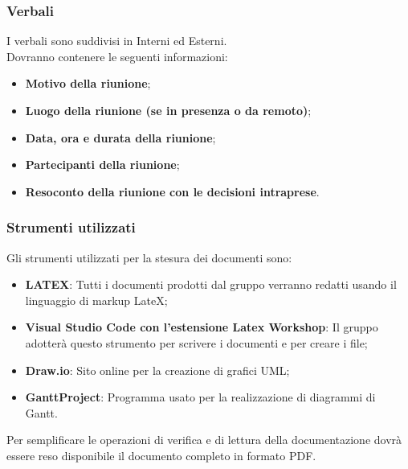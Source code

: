 \subsubsection{Verbali}\label{Verbali}
I verbali sono suddivisi in Interni ed Esterni.\\
Dovranno contenere le seguenti informazioni:
\begin{itemize}
    \item \textbf{Motivo della riunione};
    \item \textbf{Luogo della riunione (se in presenza o da remoto)};
    \item \textbf{Data, ora e durata della riunione};
    \item \textbf{Partecipanti della riunione};
    \item \textbf{Resoconto della riunione con le decisioni intraprese}.
\end{itemize}

\subsubsection{Strumenti utilizzati}
Gli strumenti utilizzati per la stesura dei documenti sono:
\begin{itemize}
    \item \textbf{LATEX}: Tutti i documenti prodotti dal gruppo verranno redatti usando il linguaggio di markup LateX;
    \item \textbf{Visual Studio Code con l’estensione Latex Workshop}: Il gruppo adotterà questo strumento per scrivere i documenti e per creare i file;
    \item \textbf{Draw.io}: Sito online per la creazione di grafici UML;
    \item \textbf{GanttProject}: Programma usato per la realizzazione di diagrammi di Gantt.
\end{itemize}
Per semplificare le operazioni di verifica e di lettura della documentazione dovrà essere reso disponibile il documento completo in formato PDF.

